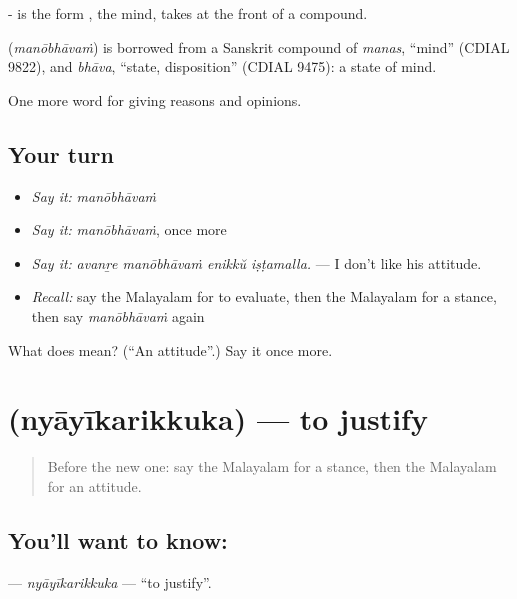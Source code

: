 - is the form , the mind, takes at the front of a compound.

\begin{cousinweb}
\textbf{} (\emph{manōbhāvaṁ}) is borrowed from a Sanskrit compound of \emph{manas}, \textquotedblleft{}mind\textquotedblright{} (CDIAL 9822), and \emph{bhāva}, \textquotedblleft{}state, disposition\textquotedblright{} (CDIAL 9475): a state of mind.
\end{cousinweb}

\begin{grammarlens}[title={What you've built}]
One more word for giving reasons and opinions.
\end{grammarlens}

\subsection*{Your turn}
\begin{itemize}
\raggedright
  \item \emph{Say it:} \emph{manōbhāvaṁ}
  \item \emph{Say it:} \emph{manōbhāvaṁ}, once more
  \item \emph{Say it:} \emph{avanṟe manōbhāvaṁ enikkŭ iṣṭamalla.} — I don't like his attitude.
  \item \emph{Recall:} say the Malayalam for to evaluate, then the Malayalam for a stance, then say \emph{manōbhāvaṁ} again
\end{itemize}

\begin{tcolorbox}[breakable,colback=teal!4,colframe=teal!35!black,title={Before you move on}]
What does  mean? (\textquotedblleft{}An attitude\textquotedblright{}.) Say it once more.
\end{tcolorbox}
\section[\texorpdfstring{\ml{ന്യായീകരിക്കുക} (nyāyīkarikkuka)}{ന്യായീകരിക്കുക (nyāyīkarikkuka)}]{ (nyāyīkarikkuka) — to justify}

\label{lesson:ML-C408-nyayikarikkuka}



\begin{quote}
Before the new one: say the Malayalam for a stance, then the Malayalam for an attitude.
\end{quote}

\subsection*{You'll want to know: }
\textbf{} — \emph{nyāyīkarikkuka} — \textquotedblleft{}to justify\textquotedblright{}.

